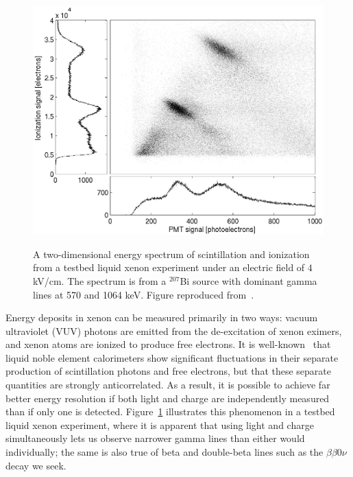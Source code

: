 \begin{figure}
\begin{center}
\includegraphics[keepaspectratio=true,width=\textwidth]{4kV_correl1.eps}
\end{center}
\renewcommand{\baselinestretch}{1}
\small\normalsize
\begin{quote}
\caption{A two-dimensional energy spectrum of scintillation and ionization from a testbed liquid xenon experiment under an electric field of $4$ kV/cm.  The spectrum is from a $^{207}$Bi source with dominant gamma lines at 570 and 1064 keV.  Figure reproduced from~\cite{PhysRevB.68.054201}.}
\label{fig:AnticorrelationInXenon}
\end{quote}
\end{figure}
\renewcommand{\baselinestretch}{2}
\small\normalsize

Energy deposits in xenon can be measured primarily in two ways: vacuum ultraviolet (VUV) photons are emitted from the de-excitation of xenon eximers, and xenon atoms are ionized to produce free electrons.  It is well-known~\cite{PhysRevB.68.054201} that liquid noble element calorimeters show significant fluctuations in their separate production of scintillation photons and free electrons, but that these separate quantities are strongly anticorrelated.  As a result, it is possible to achieve far better energy resolution if both light and charge are independently measured than if only one is detected. Figure~\ref{fig:AnticorrelationInXenon} illustrates this phenomenon in a testbed liquid xenon experiment, where it is apparent that using light and charge simultaneously lets us observe narrower gamma lines than either would individually; the same is also true of beta and double-beta lines such as the $\beta\beta 0\nu$ decay we seek.


